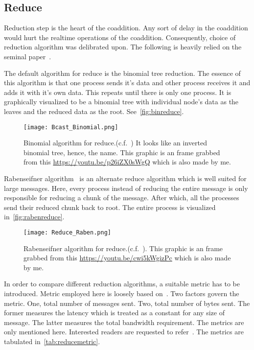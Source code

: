 \subsection {Reduce}
\label{ssub:reduce}

\par Reduction step is the heart of the coaddition. 
Any sort of delay in the coaddition would hurt the realtime operations of the coaddition. 
Consequently, choice of reduction algorithm was delibrated upon.
The following is heavily relied on the seminal paper~\cite{raben}.

\par The default \mpi algorithm for reduce is the binomial tree reduction. 
The essence of this algorithm is that one process sends it's data and other process receives it and adds it with it's own data.
This repeats until there is only one process. It is graphically visualized to be a binomial tree with individual node's data as the leaves and the reduced data as the root. 
See~\autoref{fig:binreduce}.

\begin{figure}
	\label{fig:binreduce}
	\centering
	\texttt{[image: Bcast\_Binomial.png]}
	\caption{Binomial algorithm for \mpi reduce.(c.f.~\cite{raben}) It looks like an inverted binomial tree, hence, the name.
		This graphic is an frame grabbed from this \url{https://youtu.be/p26iZX0sWgQ} which is also made by me.
	}
\end{figure}

\par Rabenseifner algorithm~\cite{raben} is an alternate reduce algorithm which is well suited for large messages.
Here, every process instead of reducing the entire message is only responsible for reducing a chunk of the message.
After which, all the processes send their reduced chunk back to root.
The entire process is visualized in~\autoref{fig:rabenreduce}.

\begin{figure}
	\centering
	\label{fig:rabenreduce}
	\texttt{[image: Reduce\_Raben.png]}
	\caption{Rabenseifner algorithm for \mpi reduce.(c.f.~\cite{raben}).
		This graphic is an frame grabbed from this \url{https://youtu.be/cwi5kWgizPc} which is also made by me.
	}
\end{figure}


\par In order to compare different reduction algorithms, a suitable metric has to be introduced.
Metric employed here is loosely based on~\cite{raben}. 
Two factors govern the metric. One, total number of messages sent. Two, total number of bytes sent.
The former measures the latency which is treated as a constant for any size of message. The latter measures the total bandwidth requirement.
The metrics are only mentioned here. Interested readers are requested to refer~\cite{raben}.
The metrics are tabulated in~\autoref{tab:reducemetric}.

